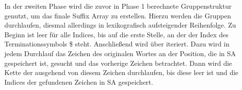 In der zweiten Phase wird die zuvor in Phase 1 berechnete Gruppenstruktur genutzt, um das finale Suffix Array zu erstellen. 
Hierzu werden die Gruppen durchlaufen, diesmal allerdings in lexikografisch aufsteigender Reihenfolge.
Zu Beginn ist \sa leer für alle Indices, bis auf die erste Stelle, an der der Index des Terminationssymbols \$ steht.
Anschließend wird über \sa iteriert.
Dazu wird in jedem Durchlauf das Zeichen des originalen Wortes an der Position, die in SA gespeichert ist, gesucht und das vorherige Zeichen betrachtet. 
Dann wird die Kette der \prevpointer ausgehend von diesem Zeichen durchlaufen, bis diese leer ist und die Indices der gefundenen Zeichen in SA gespeichert. 